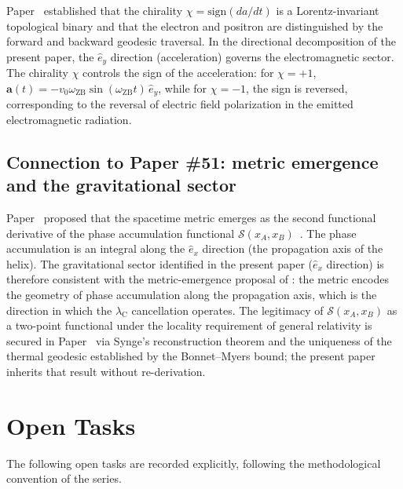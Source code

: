 \documentclass[%
 reprint, amsmath,amssymb, aps, prb, ]{revtex4-2}
\numberwithin{equation}{section}
\newcommand{\omZB}{\omega_{\text{ZB}}}
\newcommand{\lambdaC}{\lambda_{\mathrm{C}}}
\newcommand{\ehat}[1]{\hat{e}_{#1}}
\begin{document}
Paper~\cite{hanamura50} established that the chirality $\chi = \mathrm{sign}(da/dt)$ is a Lorentz-invariant topological binary and that the electron and positron are distinguished by the forward and backward geodesic traversal. In the directional decomposition of the present paper, the $\ehat{y}$ direction (acceleration) governs the electromagnetic sector. The chirality $\chi$ controls the sign of the acceleration: for $\chi = +1$, $\mathbf{a}(t) = -v_0\omZB\sin(\omZB t)\,\ehat{y}$, while for $\chi = -1$, the sign is reversed, corresponding to the reversal of electric field polarization in the emitted electromagnetic radiation.

\subsection{Connection to Paper \#51: metric emergence and the gravitational sector}
\label{subsec:p51}

Paper~\cite{hanamura51} proposed that the spacetime metric emerges as the second functional derivative of the phase accumulation functional $\mathcal{S}(x_A, x_B)$~\cite{synge1960}. The phase accumulation is an integral along the $\ehat{x}$ direction (the propagation axis of the helix). The gravitational sector identified in the present paper ($\ehat{x}$ direction) is therefore consistent with the metric-emergence proposal of \cite{hanamura51}: the metric encodes the geometry of phase accumulation along the propagation axis, which is the direction in which the $\lambdaC$ cancellation operates.
The legitimacy of $\mathcal{S}(x_A, x_B)$ as a two-point functional under the locality requirement of general relativity is secured in Paper~\cite{hanamura51} via Synge's reconstruction theorem and the uniqueness of the thermal geodesic established by the Bonnet--Myers bound; the present paper inherits that result without re-derivation.

\section{Open Tasks}
\label{sec:open}

The following open tasks are recorded explicitly, following the methodological convention of the series.
\end{document}
